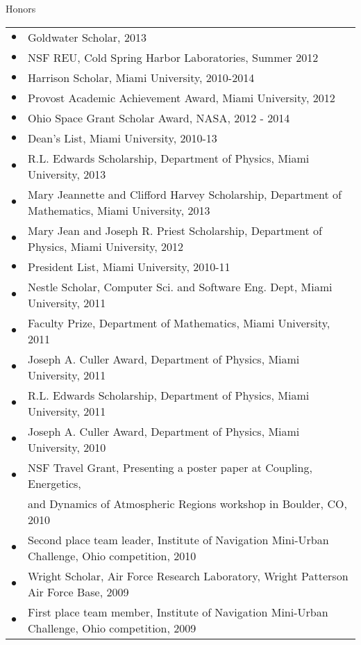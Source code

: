 \documentclass{resume} %
\begin{document}
\begin{rSection}{Honors}
  \begin{tabular}{ll}
    $\bullet$ & Goldwater Scholar, 2013\\
    $\bullet$ & NSF REU, Cold Spring Harbor Laboratories, Summer 2012\\
    $\bullet$ & Harrison Scholar, Miami University, 2010-2014\\
    $\bullet$ & Provost Academic Achievement Award, Miami University, 2012\\
    $\bullet$ & Ohio Space Grant Scholar Award, NASA, 2012 - 2014\\
    $\bullet$ & Dean’s List, Miami University, 2010-13\\
    $\bullet$ & R.L. Edwards Scholarship, Department of Physics, Miami University, 2013\\
    $\bullet$ & Mary Jeannette and Clifford Harvey Scholarship, Department of Mathematics, Miami University, 2013\\
    $\bullet$ & Mary Jean and Joseph R. Priest Scholarship, Department of Physics, Miami University, 2012\\
    $\bullet$ & President List, Miami University, 2010-11\\
    $\bullet$ & Nestle Scholar, Computer Sci. and Software Eng. Dept, Miami University, 2011\\
    $\bullet$ & Faculty Prize, Department of Mathematics, Miami University, 2011\\
    $\bullet$ & Joseph A. Culler Award, Department of Physics, Miami University, 2011\\
    $\bullet$ & R.L. Edwards Scholarship, Department of Physics, Miami University, 2011\\
    $\bullet$ & Joseph A. Culler Award, Department of Physics, Miami University, 2010\\
    $\bullet$ & NSF Travel Grant, Presenting a poster paper at Coupling, Energetics, \\
              & and Dynamics of Atmospheric Regions workshop in Boulder, CO, 2010\\
    $\bullet$ & Second place team leader, Institute of Navigation Mini-Urban Challenge, Ohio competition, 2010\\
    $\bullet$ & Wright Scholar, Air Force Research Laboratory, Wright Patterson Air Force Base, 2009\\
    $\bullet$ & First place team member, Institute of Navigation Mini-Urban Challenge, Ohio competition, 2009\\
  \end{tabular}
\end{rSection}
\end{document}
